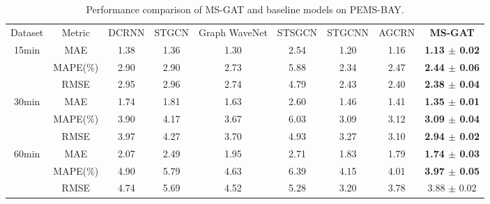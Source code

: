 \begin{table}[!htb]
    \caption{Performance comparison of MS-GAT and baseline models on PEMS-BAY.}
    \label{tab:pems-bay}
    \centering
    \begin{tabular}{ccccccccc}
        \toprule[2pt]
        \multirow{2}{*}{Dataset}                    &
        \multirow{2}{*}{Metric}                     &
        \multirow{2}{*}{DCRNN}                      &
        \multirow{2}{*}{STGCN}                      &
        \multirow{2}{*}{Graph WaveNet}              &
        \multirow{2}{*}{STSGCN}                     &
        \multirow{2}{*}{STGCNN}                     &
        \multirow{2}{*}{AGCRN}                      &
        \multirow{2}{*}{\textbf{MS-GAT}}                                                                                                        
        \\
        \\
        \hline
        \multicolumn{1}{c|}{\multirow{3}{*}{15min}} & \multicolumn{1}{c|}{MAE}      & 1.38 & 1.36 & 1.30 & 2.54 & 1.20 & 1.16 & \textbf{1.13 $\pm$ 0.02} \\
        \multicolumn{1}{c|}{}                       & \multicolumn{1}{c|}{MAPE(\%)} & 2.90 & 2.90 & 2.73 & 5.88 & 2.34 & 2.47 & \textbf{2.44 $\pm$ 0.06} \\
        \multicolumn{1}{c|}{}                       & \multicolumn{1}{c|}{RMSE}     & 2.95 & 2.96 & 2.74 & 4.79 & 2.43 & 2.40 & \textbf{2.38 $\pm$ 0.04} \\
        \hline
        \multicolumn{1}{c|}{\multirow{3}{*}{30min}} & \multicolumn{1}{c|}{MAE}      & 1.74 & 1.81 & 1.63 & 2.60 & 1.46 & 1.41 & \textbf{1.35 $\pm$ 0.01} \\
        \multicolumn{1}{c|}{}                       & \multicolumn{1}{c|}{MAPE(\%)} & 3.90 & 4.17 & 3.67 & 6.03 & 3.09 & 3.12 & \textbf{3.09 $\pm$ 0.04} \\
        \multicolumn{1}{c|}{}                       & \multicolumn{1}{c|}{RMSE}     & 3.97 & 4.27 & 3.70 & 4.93 & 3.27 & 3.10 & \textbf{2.94 $\pm$ 0.02} \\
        \hline
        \multicolumn{1}{c|}{\multirow{3}{*}{60min}} & \multicolumn{1}{c|}{MAE}      & 2.07 & 2.49 & 1.95 & 2.71 & 1.83 & 1.79 & \textbf{1.74 $\pm$ 0.03} \\
        \multicolumn{1}{c|}{}                       & \multicolumn{1}{c|}{MAPE(\%)} & 4.90 & 5.79 & 4.63 & 6.39 & 4.15 & 4.01 & \textbf{3.97 $\pm$ 0.05} \\
        \multicolumn{1}{c|}{}                       & \multicolumn{1}{c|}{RMSE}     & 4.74 & 5.69 & 4.52 & 5.28 & 3.20 & 3.78 & 3.88 $\pm$ 0.02          \\
        \bottomrule[2pt]
    \end{tabular}
\end{table}

